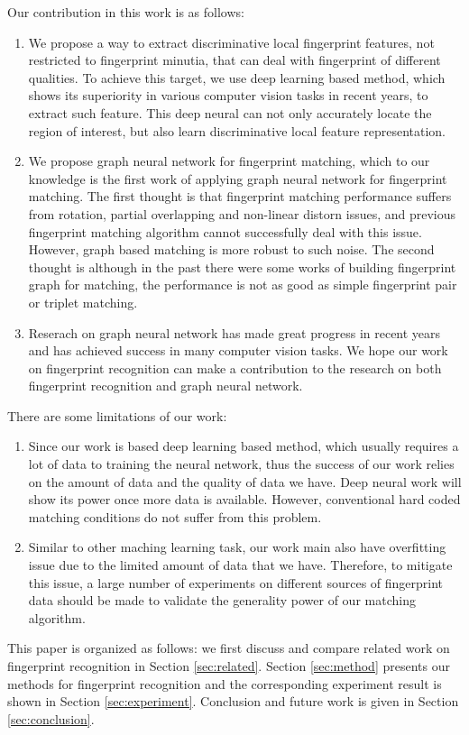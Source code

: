 Our contribution in this work is as follows:
\begin{enumerate}
    \item We propose a way to extract discriminative local fingerprint features, not restricted to fingerprint minutia, that can deal with fingerprint of different qualities. To achieve this target, we use deep learning based method, which shows its superiority in various computer vision tasks in recent years, to extract such feature. This deep neural can not only accurately locate the region of interest, but also learn discriminative local feature representation. 
    \item We propose graph neural network for fingerprint matching, which to our knowledge is the first work of applying graph neural network for fingerprint matching. The first thought is that fingerprint matching performance suffers from rotation, partial overlapping and non-linear distorn issues, and previous fingerprint matching algorithm cannot successfully deal with this issue. However, graph based matching is more robust to such noise. The second thought is although in the past there were some works of building fingerprint graph for matching, the performance is not as good as simple fingerprint pair or triplet matching.
    \item Reserach on graph neural network has made great progress in recent years and has achieved success in many computer vision tasks. We hope our work on fingerprint recognition can make a contribution to the research on both fingerprint recognition and graph neural network.
\end{enumerate}

There are some limitations of our work:
\begin{enumerate}
    \item Since our work is based deep learning based method, which usually requires a lot of data to training the neural network, thus the success of our work relies on the amount of data and the quality of data we have. Deep neural work will show its power once more data is available. However, conventional hard coded matching conditions do not suffer from this problem.
    \item Similar to other maching learning task, our work main also have overfitting issue due to the limited amount of data that we have. Therefore, to mitigate this issue, a large number of experiments on different sources of fingerprint data should be made to validate the generality power of our matching algorithm.
\end{enumerate}

This paper is organized as follows: we first discuss and compare related work on fingerprint recognition in Section \ref{sec:related}. Section \ref{sec:method} presents our methods for fingerprint recognition and the corresponding experiment result is shown in Section \ref{sec:experiment}. Conclusion and future work is given in Section \ref{sec:conclusion}.